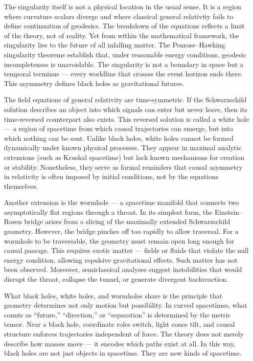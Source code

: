 The singularity itself is not a physical location in the usual sense. It is a region where curvature scalars diverge and where classical general relativity fails to define continuation of geodesics. The breakdown of the equations reflects a limit of the theory, not of reality. Yet from within the mathematical framework, the singularity lies to the future of all infalling matter. The Penrose–Hawking singularity theorems establish that, under reasonable energy conditions, geodesic incompleteness is unavoidable. The singularity is not a boundary in space but a temporal terminus — every worldline that crosses the event horizon ends there. This asymmetry defines black holes as gravitational futures.


The field equations of general relativity are time-symmetric. If the Schwarzschild solution describes an object into which signals can enter but never leave, then its time-reversed counterpart also exists. This reversed solution is called a white hole — a region of spacetime from which causal trajectories can emerge, but into which nothing can be sent. Unlike black holes, white holes cannot be formed dynamically under known physical processes. They appear in maximal analytic extensions (such as Kruskal spacetime) but lack known mechanisms for creation or stability. Nonetheless, they serve as formal reminders that causal asymmetry in relativity is often imposed by initial conditions, not by the equations themselves.


Another extension is the wormhole — a spacetime manifold that connects two asymptotically flat regions through a throat. In its simplest form, the Einstein–Rosen bridge arises from a slicing of the maximally extended Schwarzschild geometry. However, the bridge pinches off too rapidly to allow traversal. For a wormhole to be traversable, the geometry must remain open long enough for causal passage. This requires exotic matter — fields or fluids that violate the null energy condition, allowing repulsive gravitational effects. Such matter has not been observed. Moreover, semiclassical analyses suggest instabilities that would disrupt the throat, collapse the tunnel, or generate divergent backreaction.


What black holes, white holes, and wormholes share is the principle that geometry determines not only motion but possibility. In curved spacetimes, what counts as “future,” “direction,” or “separation” is determined by the metric tensor. Near a black hole, coordinate roles switch, light cones tilt, and causal structure enforces trajectories independent of force. The theory does not merely describe how masses move — it encodes which paths exist at all. In this way, black holes are not just objects in spacetime. They are new kinds of spacetime.

